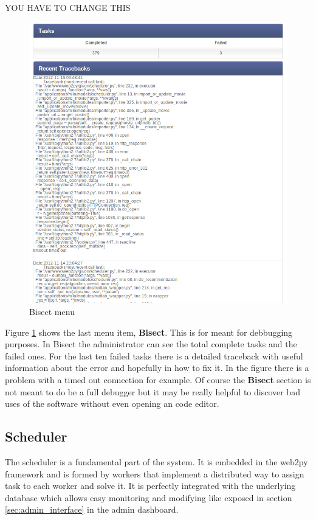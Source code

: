 YOU HAVE TO CHANGE THIS

\begin{figure}
  \centering
  \includegraphics[width=\textwidth]{figures/bisect.png}
  \caption{Bisect menu}
  \label{fig:bisect_menu}
\end{figure}

Figure \ref{fig:bisect_menu} shows the last menu item, \textbf{Bisect}. This is for meant for debbugging purposes. In Bisect the administrator can see the total complete tasks and the failed ones. For the last ten failed tasks there is a detailed traceback with useful information about the error and hopefully in how to fix it. In the figure there is a problem with a timed out connection for example. Of course the \textbf{Bisect} section is not meant to do be a full debugger but it may be really helpful to discover bad uses of the software without even opening an code editor.

\subsection{Scheduler}
\label{sec:scheduler}

The scheduler is a fundamental part of the system. It is embedded in the web2py \cite{web2py} framework and is formed by workers that implement a distributed way to assign task to each worker and solve it. It is perfectly integrated with the underlying database which allows easy monitoring and modifying like exposed in section \ref{sec:admin_interface} in the admin dashboard.


